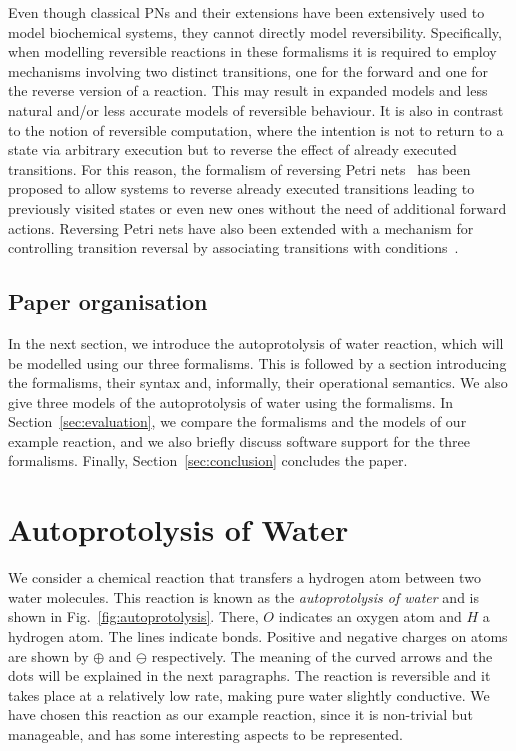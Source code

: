 \documentclass[runningheads]{llncs}
\begin{document}
Even though classical PNs and their extensions have been extensively used to model biochemical systems, 
they cannot directly model reversibility. Specifically, when  modelling reversible reactions in these formalisms
it is required to employ mechanisms involving two distinct transitions,
one for the forward and one for the reverse version of a reaction. This
may result in expanded models and less natural and/or less accurate
models of  reversible behaviour. It is also in contrast to the notion of reversible computation, 
where the intention is not to return to a state via arbitrary execution but to reverse the effect of already executed transitions. 
For this reason, the formalism of reversing Petri nets~\cite{RPNs} has been proposed to allow 
systems to reverse already executed transitions leading to previously visited states 
or even new ones without the need of additional 
forward actions. Reversing Petri nets 
have also been extended with a mechanism for controlling transition
reversal by associating transitions with conditions~\cite{RC19}.


\subsection{Paper organisation} 
In the next section, we introduce the autoprotolysis of water 
reaction, which will be modelled using our three formalisms. This is followed by a section 
introducing the formalisms, their syntax and, informally, their operational semantics. We also 
give three models of the autoprotolysis of water using the formalisms. In Section~\ref{sec:evaluation}, we compare the formalisms and the models of our example reaction, and we also 
briefly discuss software support for the three formalisms. Finally, Section~\ref{sec:conclusion} concludes the paper.

\section{Autoprotolysis of Water}

We consider a chemical reaction that transfers a hydrogen atom between two water molecules. This
reaction is known as the \emph{autoprotolysis of water} and is shown 
in Fig.~\ref{fig:autoprotolysis}. There, $O$ indicates an oxygen atom and $H$ a hydrogen atom. The lines indicate bonds. Positive and negative charges on atoms are shown by $\oplus$ and $\ominus$
respectively. The meaning of the curved arrows and the dots will be explained in the next paragraphs.
The reaction is reversible and it takes place at a relatively 
low rate, making pure water slightly conductive. We have chosen this reaction 
as our example reaction, since it is non-trivial but manageable, and has some
interesting aspects to be represented.
\end{document}
